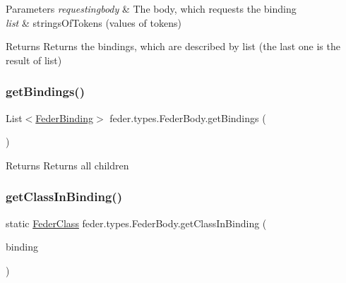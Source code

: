 \begin{DoxyParams}{Parameters}
{\em requestingbody} & The body, which requests the binding \\
\hline
{\em list} & strings\+Of\+Tokens (values of tokens) \\
\hline
\end{DoxyParams}
\begin{DoxyReturn}{Returns}
Returns the bindings, which are described by list (the last one is the result of \textquotesingle{}list\textquotesingle{}) 
\end{DoxyReturn}
\mbox{\label{classfeder_1_1types_1_1FederBody_a8e867ab209301d58c984c4e27d324325}} 
\subsubsection{\texorpdfstring{get\+Bindings()}{getBindings()}}
{\footnotesize\ttfamily List$<$\hyperlink{classfeder_1_1types_1_1FederBinding}{Feder\+Binding}$>$ feder.\+types.\+Feder\+Body.\+get\+Bindings (\begin{DoxyParamCaption}{ }\end{DoxyParamCaption})}

\begin{DoxyReturn}{Returns}
Returns all children 
\end{DoxyReturn}
\mbox{\label{classfeder_1_1types_1_1FederBody_a7e2624283680ec9dfd0a6816da173540}} 
\subsubsection{\texorpdfstring{get\+Class\+In\+Binding()}{getClassInBinding()}}
{\footnotesize\ttfamily static \hyperlink{classfeder_1_1types_1_1FederClass}{Feder\+Class} feder.\+types.\+Feder\+Body.\+get\+Class\+In\+Binding (\begin{DoxyParamCaption}\item[{\hyperlink{classfeder_1_1types_1_1FederBinding}{Feder\+Binding}}]{binding }\end{DoxyParamCaption})\hspace{0.3cm}{\ttfamily [static]}}


